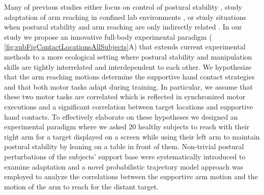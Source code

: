 Many of previous studies 
either focus on control of postural stability \cite{horak1986central, 
kuo1995optimal, winter1995human, Lockhart2007}, study adaptation of arm reaching 
in confined lab environments \cite{shadmehr1993postural, wolpert1995arm, d2006control, 
diedrichsen2010coordination, berger2013differences}, or study situations when 
postural stability and arm reaching are only indirectly related 
\cite{flash1990human, stapley1999does, slijper2000effects, babivc2014effects, 
johannsen2007effects}.
%
In our study we propose an innovative full-body experimental paradigm 
(\FigureAbbr 
\ref{fig:subFigContactLocationsAllSubjects}A) that extends current experimental 
methods to a more ecological setting where postural stability and manipulation 
skills are tightly interrelated and interdependent to each other. We hypothesize that the arm reaching motions determine the supportive hand 
contact strategies and that both motor tasks adapt during training. In 
particular, we assume that these two motor tasks are correlated which is 
reflected in synchronized motor executions and a significant correlation between 
target locations and supportive hand contacts. To effectively elaborate on these hypotheses we designed an experimental paradigm where we
asked $20$ 
healthy subjects to reach with their right arm for a target displayed on a 
screen while using their left arm to maintain postural stability by leaning on a 
table in front of them.
Non-trivial postural perturbations 
of the subjects' support base were systematically introduced to examine 
adaptation and a novel probabilistic trajectory model approach was employed to 
analyze the correlations between the supportive arm motion and the motion of the 
arm to reach for the distant target.


